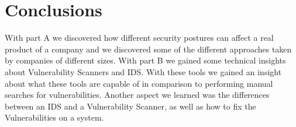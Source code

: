 \section{Conclusions}

With part A we discovered how different security postures can affect a real product of a company and we discovered some of the different approaches taken by companies of different sizes. With part B we gained some technical insights about Vulnerability Scanners and IDS. With these tools we gained an insight about what these tools are capable of in comparison to performing manual searches for vulnerabilities. Another aspect we learned was the differences between an IDS and a Vulnerability Scanner, as well as how to fix the Vulnerabilities on a system.

\pagebreak